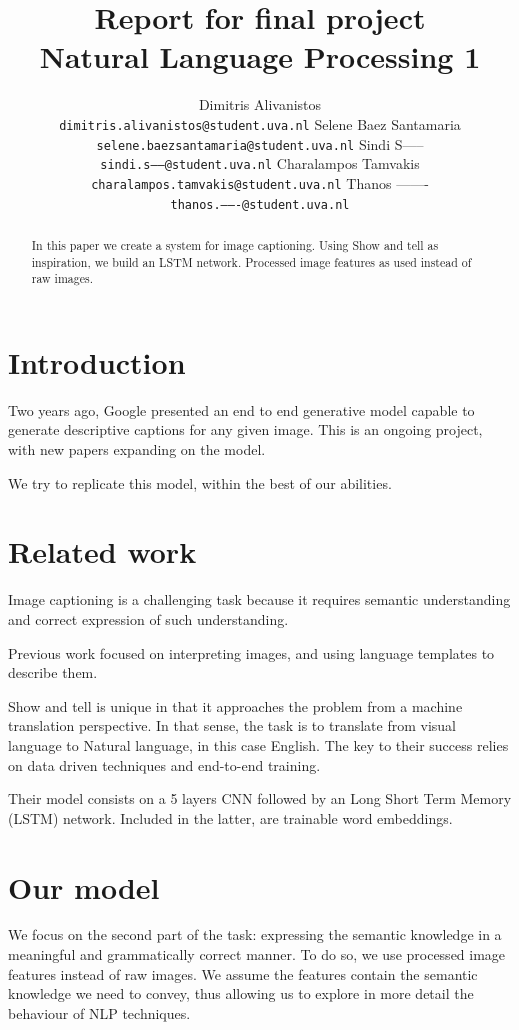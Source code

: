 \documentclass{article}
\title{Report for final project \\ Natural Language Processing 1}
\author{
  Dimitris Alivanistos\\
  \texttt{dimitris.alivanistos@student.uva.nl} \And
  Selene Baez Santamaria\\
  \texttt{selene.baezsantamaria@student.uva.nl} \And
  Sindi S-----\\
  \texttt{sindi.s------@student.uva.nl} \And
  Charalampos Tamvakis\\
  \texttt{charalampos.tamvakis@student.uva.nl} \And 
  Thanos -------\\
  \texttt{thanos.-------@student.uva.nl}
}
\begin{document}

\maketitle
\begin{abstract}
	In this paper we create a system for image captioning. Using Show and tell as inspiration, we build an LSTM network. Processed image features as used instead of raw images.
\end{abstract}

\section{Introduction}
Two years ago, Google presented an end to end generative model capable to generate descriptive captions for any given image. This is an ongoing project, with new papers expanding on the model. 

We try to replicate this model, within the best of our abilities. 

\section{Related work}
Image captioning is a challenging task because it requires semantic understanding and correct expression of such understanding. 

Previous work focused on interpreting images, and using language templates to describe them. 

Show and tell is unique in that it approaches the problem from a machine translation perspective. In that sense, the task is to translate from visual language to Natural language, in this case English. The key to their success relies on data driven techniques and end-to-end training. 

Their model consists on a 5 layers CNN followed by an Long Short Term Memory (LSTM) network. Included in the latter, are trainable word embeddings.  

\section{Our model}
We focus on the second part of the task: expressing the semantic knowledge in a meaningful and grammatically correct manner. To do so, we use processed image features instead of raw images. We assume the features contain the semantic knowledge we need to convey, thus allowing us to explore in more detail the behaviour of NLP techniques. 
\end{document}
